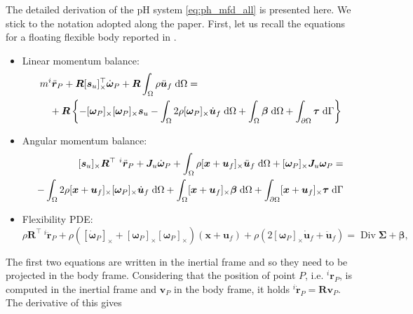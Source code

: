 \documentclass{svjour3}                     %
\DeclareMathOperator*{\Div}{Div}
\newcommand{\crmat}[1]{\ensuremath{[#1]_{\times}}}
\begin{document}
The detailed derivation of the pH system \eqref{eq:ph_mfd_all} is presented here. We stick to the notation adopted along the paper. First, let us recall the equations for a floating flexible body reported in \cite{MB_Daepde,simeon2013computational}.
\begin{itemize}
\item Linear momentum balance:
\begin{equation}
\label{eq:rig_tr3}
\begin{split}
&m ^{i}\ddot{\bm{r}}_P + \bm{R} \crmat{\bm{s}_u}^\top \dot{\bm{\omega}}_P  + \bm{R} \int_{\Omega} \rho \ddot{\bm{u}}_f \d{\Omega} = \\
&\quad + \bm{R} \left\{ -\crmat{\bm{\omega}_P} \crmat{\bm{\omega}_P} \bm{s}_u -  \int_{\Omega} 2 \rho \crmat{\bm{\omega}_P} \dot{\bm{u}}_f \d{\Omega} +  \int_{\Omega} \bm\beta \d{\Omega} +  \int_{\partial \Omega} \bm\tau \d{\Gamma}  \right\} 
\end{split}
\end{equation}
\item Angular momentum balance:
\begin{equation}
\label{eq:rig_rot3}
\begin{split}
\crmat{\bm{s}_u} {\bm{R}^{\top}} \ ^{i}\ddot{\bm{r}}_P + \bm{J}_u \dot{\bm\omega}_P + \int_{\Omega} \rho \crmat{\bm{x}+\bm{u}_f} \ddot{\bm{u}}_f \d{\Omega} + \crmat{\bm{\omega}_P} \bm{J}_u \bm{\omega}_P = \\ 
- \int_{\Omega} 2\rho \crmat{\bm{x}+\bm{u}_f} \crmat{\bm\omega_P} \dot{\bm{u}}_f \d{\Omega} + \int_{\Omega}\crmat{\bm{x}+\bm{u}_f} \bm\beta \d{\Omega} + \int_{\partial \Omega}\crmat{\bm{x}+\bm{u}_f} \bm\tau \d{\Gamma} \\
\end{split}
\end{equation}
\item Flexibility PDE:
\begin{equation}
\label{eq:flex3}
\rho  {\bm{R}^{\top}} \ ^{i}\ddot{\bm{r}}_P + \rho (\crmat{\dot{\bm\omega}_P} + \crmat{\bm{\omega}_P}\crmat{\bm{\omega}_P})(\bm{x}+\bm{u}_f) + \rho (2 \crmat{\bm{\omega}_P} \dot{\bm{u}}_f + \ddot{\bm{u}}_f) = \Div{\bm\Sigma} + \bm\beta,
\end{equation}
\end{itemize}
The first two equations are written in the inertial frame and so they need to be projected in the body frame. Considering that the position of point $P$, i.e. $^{i}{\bm{r}}_P$, is computed in the inertial frame and $\bm{v}_P$ in the body frame, it holds $^{i}\dot{\bm{r}}_P = \bm{R} \bm{v}_P$. The derivative of this gives
\end{document}
